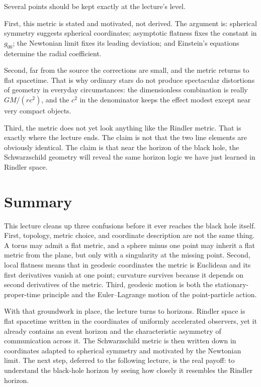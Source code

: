 Several points should be kept exactly at the lecture's level.

First, this metric is stated and motivated, not derived. The argument is: spherical symmetry suggests spherical coordinates; asymptotic flatness fixes the constant in \(g_{00}\); the Newtonian limit fixes its leading deviation; and Einstein's equations determine the radial coefficient.

Second, far from the source the corrections are small, and the metric returns to flat spacetime. That is why ordinary stars do not produce spectacular distortions of geometry in everyday circumstances: the dimensionless combination is really \(GM/(rc^2)\), and the \(c^2\) in the denominator keeps the effect modest except near very compact objects.

Third, the metric does not yet look anything like the Rindler metric. That is exactly where the lecture ends. The claim is not that the two line elements are obviously identical. The claim is that near the horizon of the black hole, the Schwarzschild geometry will reveal the same horizon logic we have just learned in Rindler space.

\section{Summary}

This lecture cleans up three confusions before it ever reaches the black hole itself. First, topology, metric choice, and coordinate description are not the same thing. A torus may admit a flat metric, and a sphere minus one point may inherit a flat metric from the plane, but only with a singularity at the missing point. Second, local flatness means that in geodesic coordinates the metric is Euclidean and its first derivatives vanish at one point; curvature survives because it depends on second derivatives of the metric. Third, geodesic motion is both the stationary-proper-time principle and the Euler--Lagrange motion of the point-particle action.

With that groundwork in place, the lecture turns to horizons. Rindler space is flat spacetime written in the coordinates of uniformly accelerated observers, yet it already contains an event horizon and the characteristic asymmetry of communication across it. The Schwarzschild metric is then written down in coordinates adapted to spherical symmetry and motivated by the Newtonian limit. The next step, deferred to the following lecture, is the real payoff: to understand the black-hole horizon by seeing how closely it resembles the Rindler horizon.